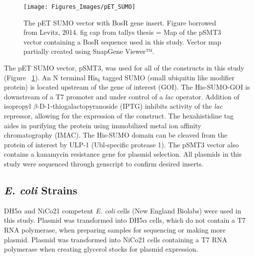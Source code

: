 \documentclass[12pt,twoside]{reedthesis}
\begin{document}
   	\begin{figure}[h]
   		
   		\centering
   		\texttt{[image: Figures\_Images/pET\_SUMO]}
   		\caption[pET SUMO Vector with BosR Insert]{The pET SUMO vector with BosR gene insert. Figure borrowed from Levitz, 2014. fig cap from tallys thesis = Map of the pSMT3 vector containing a BosR sequence used in this study.
   			Vector map partially created using SnapGene Viewer™.}
   		\label{pETSUMOBosR}
   	\end{figure}
   	
   The pET SUMO vector, pSMT3, was used for all of the constructs in this study (Figure ~\ref{pETSUMOBosR}). An N terminal His$_{6}$ tagged SUMO (small ubiquitin like modifier protein) is located upstream of the gene of interest (GOI). The His-SUMO-GOI is downstream of a T7 promoter and  under control of a \textit{lac} operator. Addition of isopropyl $\beta$-D-1-thiogalactopyranoside (IPTG) inhibits activity of the \textit{lac} repressor, allowing for the expression of the construct. The hexahistidine tag aides in purifying the protein using immobilized metal ion affinity chromatography (IMAC). The His-SUMO domain can be cleaved from the protein of interest by ULP-1 (Ubl-specific protease 1). The pSMT3 vector also contains a kanamycin resistance gene for plasmid selection. All plasmids in this study were sequenced through genscript to confirm desired inserts. 
   
   \subsection{\textit{E. coli} Strains}
   
   DH5$\alpha$ and NiCo21 competent \textit{E. coli} cells (New England Biolabs) were used in this study. Plasmid was transformed into DH5$\alpha$ cells, which do not contain a T7 RNA polymerase, when preparing samples for sequencing or making more plasmid. Plasmid was transformed into NiCo21 cells containing a T7 RNA polymerase when creating glycerol stocks for plasmid expression. 
   
\end{document}
